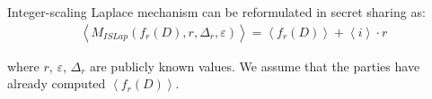       Integer-scaling Laplace mechanism can be reformulated in secret sharing as:
      \begin{equation}
            \begin{split}
                  \left\langle M_{ISLap}\left(f_r\left(D\right),r,\Delta_r,\varepsilon\right)\right\rangle =\left\langle f_r\left(D\right)\right\rangle + \left\langle i\right\rangle \cdot r
            \end{split}
      \end{equation}

      where $r$, $\varepsilon$, $\Delta _r$ are publicly known values. We assume that the parties have already computed $\left\langle {f_r\left(D\right)}\right\rangle$.




